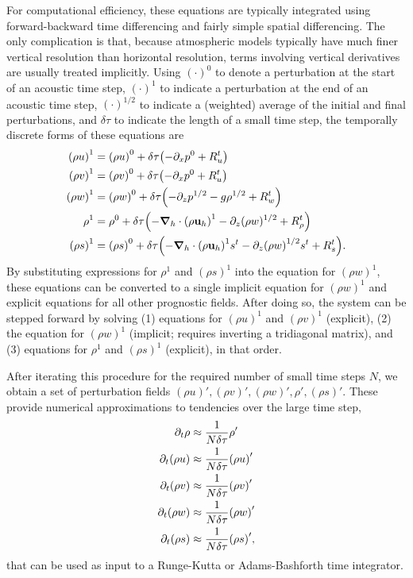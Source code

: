 \documentclass[11pt]{article}
\begin{document}
For computational efficiency, these equations are typically integrated using forward-backward time differencing and fairly simple spatial differencing. The only complication is that, because atmospheric models typically have much finer vertical resolution than horizontal resolution, terms involving vertical derivatives are usually treated implicitly. Using $(\cdot)^0$ to denote a perturbation at the start of an acoustic time step, $(\cdot)^1$ to indicate a perturbation at the end of an acoustic time step, $(\cdot)^{1/2}$ to indicate a (weighted) average of the initial and final perturbations, and $\delta \tau$ to indicate the length of a small time step, the temporally discrete forms of these equations are
\begin{align}
\qty(\rho u)^1 &= \qty(\rho u)^0 + \delta \tau \qty(-\partial_x p^0 + R_u^t) \\
\qty(\rho v)^1 &= \qty(\rho v)^0 + \delta \tau \qty(-\partial_x p^0 + R_u^t) \\
\qty(\rho w)^1 &= \qty(\rho w)^0 + \delta \tau \qty(-\partial_z p^{1/2} - g \rho^{1/2} + R_w^t) \\
\rho^1 &= \rho^0 + \delta \tau \qty(-\grad_h \cdot \qty(\rho {\bf u}_h)^{1} -\partial_z (\rho w)^{1/2} + R_{\rho}^t) \\
\qty(\rho s)^1 &= \qty(\rho s)^0 + \delta \tau \qty(-\grad_h \cdot \qty(\rho {\bf u}_h)^{1} s^t - \partial_z \qty(\rho w)^{1/2} s^t + R_s^t).
\end{align} 
By substituting expressions for $\rho^1$ and $(\rho s)^1$ into the equation for $(\rho w)^1$, these equations can be converted to a single implicit equation for $(\rho w)^1$ and explicit equations for all other prognostic fields. After doing so, the system can be stepped forward by solving (1) equations for $(\rho u)^1$ and $(\rho v)^1$ (explicit), (2) the equation for $(\rho w)^1$ (implicit; requires inverting a tridiagonal matrix), and (3) equations for $\rho^1$ and $(\rho s)^1$ (explicit), in that order.

After iterating this procedure for the required number of small time steps $N$, we obtain a set of perturbation fields $(\rho u)', (\rho v)', (\rho w)', \rho', (\rho s)'$. These provide numerical approximations to tendencies over the large time step,
\begin{align*}
\partial_t \rho &\approx \frac{1}{N \delta \tau} \rho' \\
\partial_t \qty(\rho u) &\approx \frac{1}{N \delta \tau} \qty(\rho u)' \\
\partial_t \qty(\rho v) &\approx \frac{1}{N \delta \tau} \qty(\rho v)' \\
\partial_t \qty(\rho w) &\approx \frac{1}{N \delta \tau} \qty(\rho w)' \\
\partial_t \qty(\rho s) &\approx \frac{1}{N \delta \tau} \qty(\rho s)',
\end{align*}
that can be used as input to a Runge-Kutta or Adams-Bashforth time integrator.
\end{document}
